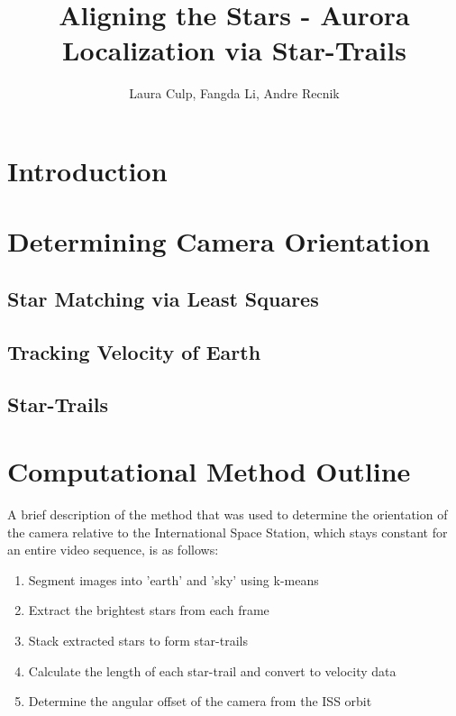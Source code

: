 \documentclass[12pt]{article}
\title{Aligning the Stars - Aurora Localization via Star-Trails}
\author{ Laura Culp, Fangda Li, Andre Recnik \\
}
\theoremstyle{definition}
\begin{document}
\maketitle

\break 

\setcounter{equation}{0} \setcounter{section}{0}

\section{\bf Introduction }


\section{ \bf Determining Camera Orientation }

\subsection{ \bf Star Matching via Least Squares }

\subsection{ \bf Tracking Velocity of Earth }

\subsection{ \bf Star-Trails }


\section{\bf Computational Method Outline }

A brief description of the method that was used to determine the orientation of the camera relative to the International Space Station, which stays constant for an entire video sequence, is as follows:
\begin{enumerate}
\item Segment images into 'earth' and 'sky' using k-means
\item Extract the brightest stars from each frame
\item Stack extracted stars to form star-trails
\item Calculate the length of each star-trail and convert to velocity data
\item Determine the angular offset of the camera from the ISS orbit
\end{enumerate}
\end{document}
